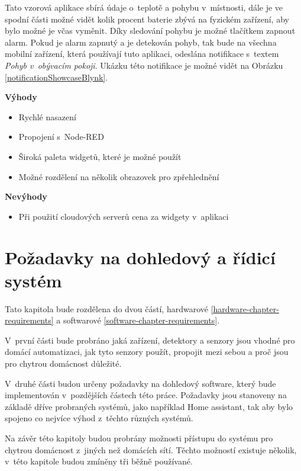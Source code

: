 Tato vzorová aplikace sbírá údaje o~teplotě a pohybu v~místnosti, dále je ve spodní části možné vidět kolik procent baterie zbývá na fyzickém zařízení, aby bylo možné je včas vyměnit. Díky sledování pohybu je možné tlačítkem zapnout alarm. Pokud je alarm zapnutý a je detekován pohyb, tak bude na všechna mobilní zařízení, která používají tuto aplikaci, odeslána notifikace s~textem \emph{Pohyb v~obývacím pokoji}. Ukázku této notifikace je možné vidět na Obrázku \ref{notificationShowcaseBlynk}.

\noindent\textbf{Výhody}
\begin{itemize}
  \item Rychlé nasazení
  \item Propojení s~Node-RED
  \item Široká paleta widgetů, které je možné použít
  \item Možné rozdělení na několik obrazovek pro zpřehlednění
\end{itemize}

\noindent\textbf{Nevýhody}
\begin{itemize}
  \item Při použití cloudových serverů cena za widgety v~aplikaci
\end{itemize}


\chapter{Požadavky na dohledový a řídicí systém} \label{requirements}
Tato kapitola bude rozdělena do dvou částí, hardwarové \ref{hardware-chapter-requirements} a softwarové \ref{software-chapter-requirements}.

V~první části bude probráno jaká zařízení, detektory a senzory jsou vhodné pro domácí automatizaci, jak tyto senzory použít, propojit mezi sebou a proč jsou pro chytrou domácnost důležité.

V~druhé části budou určeny požadavky na dohledový software, který bude implementován v~pozdějších částech této práce. Požadavky jsou stanoveny na základě dříve probraných systémů, jako například Home assistant, tak aby bylo spojeno co nejvíce výhod z~těchto různých systémů.

Na závěr této kapitoly budou probrány možnosti přístupu do systému pro chytrou domácnost z~jiných než domácích sítí. Těchto možností existuje několik, v~této kapitole budou zmíněny tři běžně používané. 

